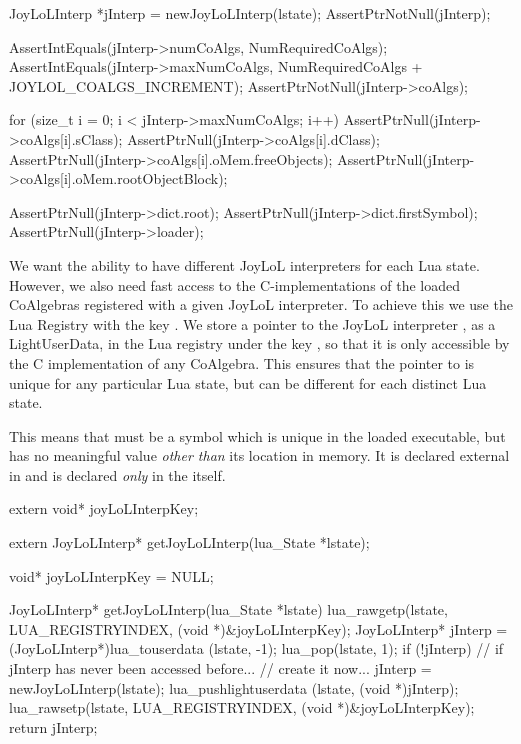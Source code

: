 
\startCTest
  JoyLoLInterp *jInterp = newJoyLoLInterp(lstate);
  AssertPtrNotNull(jInterp);
  
  AssertIntEquals(jInterp->numCoAlgs,
    NumRequiredCoAlgs);
  AssertIntEquals(jInterp->maxNumCoAlgs,
    NumRequiredCoAlgs + JOYLOL_COALGS_INCREMENT);
  AssertPtrNotNull(jInterp->coAlgs);
  
  for (size_t i = 0; i < jInterp->maxNumCoAlgs; i++) {
    AssertPtrNull(jInterp->coAlgs[i].sClass);
    AssertPtrNull(jInterp->coAlgs[i].dClass);
    AssertPtrNull(jInterp->coAlgs[i].oMem.freeObjects);
    AssertPtrNull(jInterp->coAlgs[i].oMem.rootObjectBlock);
  }
  
  AssertPtrNull(jInterp->dict.root);
  AssertPtrNull(jInterp->dict.firstSymbol);
  AssertPtrNull(jInterp->loader);
\stopCTest
\stopTestCase
\stopTestSuite


We want the ability to have different JoyLoL interpreters for each Lua 
state. However, we also need fast access to the C-implementations of the 
loaded CoAlgebras registered with a given JoyLoL interpreter. To achieve 
this we use the Lua Registry with the  key 
. We store a pointer to the JoyLoL interpreter 
, as a LightUserData, in the Lua registry under the key 
, so that it is only accessible by the C 
implementation of any CoAlgebra. This ensures that the pointer to 
 is unique for any particular Lua state, but can be 
different for each distinct Lua state. 

This means that  must be a symbol which is unique in 
the loaded executable, but has no meaningful value \emph{other than} its 
location in memory. It is declared external in  and is 
declared \emph{only} in the  itself. 

\startCHeader
extern void* joyLoLInterpKey;

extern JoyLoLInterp* getJoyLoLInterp(lua_State *lstate);
\stopCHeader

\startCCode
void* joyLoLInterpKey = NULL;

JoyLoLInterp* getJoyLoLInterp(lua_State *lstate) {
  lua_rawgetp(lstate, LUA_REGISTRYINDEX, (void *)&joyLoLInterpKey);
  JoyLoLInterp* jInterp = (JoyLoLInterp*)lua_touserdata (lstate, -1);
  lua_pop(lstate, 1);
  if (!jInterp) {
    // if jInterp has never been accessed before... 
    // create it now...
    jInterp = newJoyLoLInterp(lstate);
    lua_pushlightuserdata (lstate, (void *)jInterp);
    lua_rawsetp(lstate, LUA_REGISTRYINDEX, (void *)&joyLoLInterpKey);
  }
  return jInterp;
}
\stopCCode

